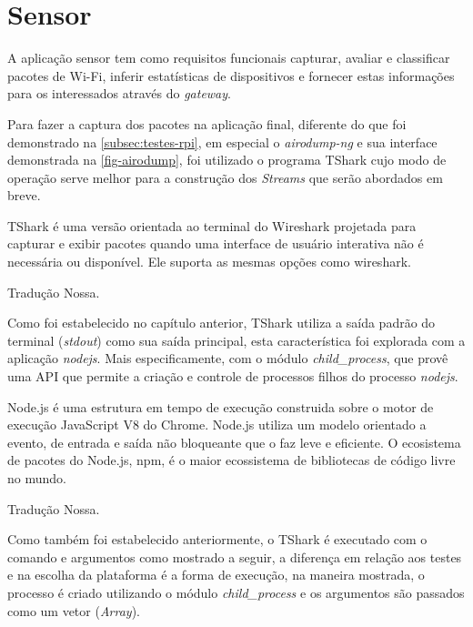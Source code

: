 \section{Sensor}
\label{sec:app-sensor}


A aplicação sensor tem como requisitos funcionais capturar, avaliar e classificar pacotes de
Wi-Fi, inferir estatísticas de dispositivos e fornecer estas informações para
os interessados através do \emph{gateway}.

Para fazer a captura dos pacotes na aplicação final, diferente do que foi
demonstrado na \autoref{subsec:testes-rpi}, em especial o \emph{airodump-ng} e
sua interface demonstrada na \autoref{fig-airodump}, foi utilizado o programa
TShark cujo modo de operação serve melhor para a construção dos
\emph{Streams} que serão abordados em breve.

\begin{citacao}

	TShark é uma versão orientada ao terminal do Wireshark projetada para capturar
	e exibir pacotes quando uma interface de usuário interativa não é necessária ou
	disponível. Ele suporta as mesmas opções como wireshark. \

	 Tradução Nossa.
\end{citacao}

Como foi estabelecido no capítulo anterior, TShark	utiliza a saída
padrão	do terminal (\emph{stdout}) como sua saída principal, esta
característica foi explorada com a aplicação \emph{nodejs}. Mais especificamente,
com o módulo \emph{child\_process},	que provê uma API que permite a criação e
controle de processos filhos do processo \emph{nodejs}.

\begin{citacao}

	Node.js é uma estrutura em tempo de execução construida sobre o motor de
	execução JavaScript V8 do Chrome. Node.js utiliza um modelo orientado a
	evento, de entrada e saída não bloqueante que o faz leve e eficiente.
	O ecosistema de pacotes do Node.js, npm, é o maior ecossistema de bibliotecas
	de código livre no mundo. \

	 Tradução Nossa.
\end{citacao}

Como também foi estabelecido anteriormente, o TShark é executado com o
comando e argumentos como mostrado a seguir, a diferença em relação aos testes e
na escolha da plataforma é a forma de execução, na maneira mostrada, o processo é
criado utilizando o módulo \emph{child\_process} \cite{child_process} e os
argumentos são passados como um vetor (\emph{Array}).


